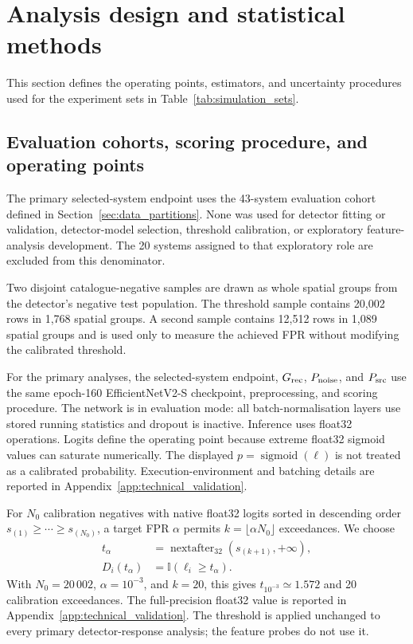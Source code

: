 \section{Analysis design and statistical methods}
\label{sec:analysis_design}

This section defines the operating points, estimators, and uncertainty
procedures used for the experiment sets in Table~\ref{tab:simulation_sets}.

\subsection{Evaluation cohorts, scoring procedure, and operating points}
\label{sec:scoring_contract}

The primary selected-system endpoint uses the 43-system evaluation cohort
defined in Section~\ref{sec:data_partitions}. None was used for detector
fitting or validation, detector-model selection, threshold calibration, or
exploratory feature-analysis development. The 20 systems assigned to that
exploratory role are excluded from this denominator.

Two disjoint catalogue-negative samples are drawn as whole spatial groups
from the detector's negative test population. The threshold sample contains
20,002 rows in 1,768 spatial groups. A second sample contains 12,512 rows in
1,089 spatial groups and is used only to measure the achieved FPR without
modifying the calibrated threshold.

For the primary analyses, the selected-system endpoint, \(G_{\rm rec}\),
\(P_{\rm noise}\), and \(P_{\rm src}\) use the same epoch-160
EfficientNetV2-S checkpoint, preprocessing, and scoring procedure. The
network is in evaluation mode:
all batch-normalisation layers use stored running statistics and dropout is
inactive. Inference uses float32 operations.
Logits define the operating point because extreme float32 sigmoid values can
saturate numerically. The displayed
\(p=\operatorname{sigmoid}(\ell)\) is not treated as a calibrated
probability. Execution-environment and batching details are reported in
Appendix~\ref{app:technical_validation}.

For \(N_0\) calibration negatives with native float32 logits sorted in
descending order
\(s_{(1)}\geq\cdots\geq s_{(N_0)}\), a target FPR \(\alpha\) permits
\(k=\lfloor\alpha N_0\rfloor\) exceedances. We choose
\begin{equation}
\begin{aligned}
 t_\alpha
 &=\operatorname{nextafter}_{32}\!\left(s_{(k+1)},+\infty\right),\\
 D_i(t_\alpha)&=\mathbb{I}(\ell_i\geq t_\alpha).
\end{aligned}
\label{eq:common_threshold}
\end{equation}
With \(N_0=20\,002\), \(\alpha=10^{-3}\), and \(k=20\),
this gives \(t_{10^{-3}}\simeq1.572\) and 20 calibration exceedances. The
full-precision float32 value is reported in
Appendix~\ref{app:technical_validation}. The threshold is applied unchanged
to every primary detector-response analysis; the feature probes do not use it.

